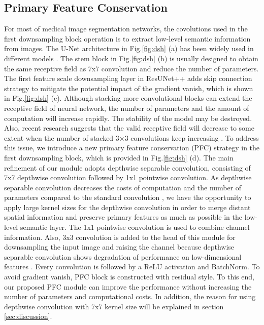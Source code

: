 \documentclass[a4paper,fleqn]{cas-dc}
\begin{document}
\subsection{Primary Feature Conservation}
\label{ssec:subhead}

For most of medical image segmentation networks, the covolutions used in the first downsampling block operation is to extract low-level semantic information from images. The U-Net architecture \cite{ronneberger2015u} in Fig.\ref{fig:dsh} (a) has been widely used in different models \cite{jha2020doubleu,oktay2018attention}. The stem block \cite{chen2019mmdetection} in Fig.\ref{fig:dsh} (b) is usually designed to obtain the same receptive field as 7x7 convolution and reduce the number of parameters. The first feature scale downsampling layer in ResUNet++ \cite{jha2019resunet++} adds skip connection strategy to mitigate the potential impact of the gradient vanish, which is shown in Fig.\ref{fig:dsh} (c). Although stacking more convolutional blocks can extend the receptive field of neural network, the number of parameters and the amount of computation will increase rapidly. The stability of the model may be destroyed. Also, recent research suggests that the valid receptive field will decrease to some extent when the number of stacked 3×3 convolutions keep increasing \cite{ding2022scaling}. To address this issue, we introduce a new primary feature conservation (PFC) strategy in the first downsampling block, which is provided in Fig.\ref{fig:dsh} (d). The main refinement of our module adopts depthwise separable convolution, consisting of 7x7 depthwise convolution followed by 1x1 pointwise convolution. As depthwise separable convolution decreases the costs of computation and the number of parameters compared to the standard convolution \cite{howard2017mobilenets}, we have the opportunity to apply large kernel sizes for the depthwise convolution in order to merge distant spatial information and preserve primary features as much as possible in the low-level semantic layer. The 1x1 pointwise convolution is used to combine channel information. Also, 3x3 convolution is added to the head of this module for downsampling the input image and raising the channel because depthwise separable convolution shows degradation of performance on low-dimensional features \cite{sandler2018mobilenetv2}. Every convolution is followed by a ReLU activation and BatchNorm. To avoid gradient vanish, PFC block is constructed with residual style. To this end, our proposed PFC module can improve the performance without increasing the number of parameters and computational costs. In addition, the reason for using depthwise convolution with 7x7 kernel size will be explained in section \ref{sec:discussion}.
\end{document}
